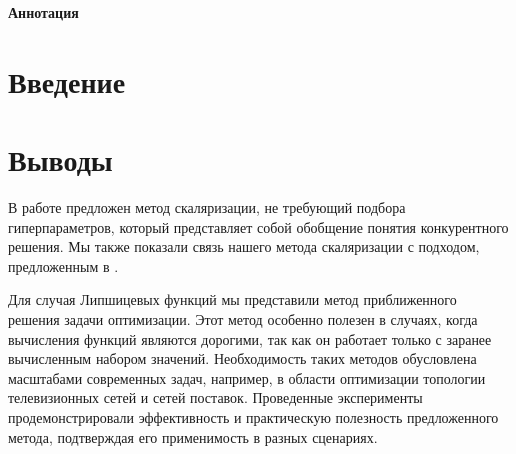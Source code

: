 \documentclass[14pt]{extarticle}
\begin{document}

\setcounter{page}{2}

\tableofcontents
\newpage
\begin{center}
    \Large{\textbf{Аннотация}}
\end{center}
\abstractText
\newpage


% 
\section{Введение} 

\newpage

\newpage

\newpage


\newpage
\section{Выводы}
В работе предложен метод скаляризации, не требующий подбора гиперпараметров, который представляет собой обобщение понятия конкурентного решения. Мы также показали связь нашего метода скаляризации с подходом, предложенным в \cite{gembicki1975approach}.

Для случая Липшицевых функций мы представили метод приближенного решения задачи оптимизации. Этот метод особенно полезен в случаях, когда вычисления функций являются дорогими, так как он работает только с заранее вычисленным набором значений. Необходимость таких методов обусловлена масштабами современных задач, например, в области оптимизации топологии телевизионных сетей и сетей поставок. Проведенные эксперименты продемонстрировали эффективность и практическую полезность предложенного метода, подтверждая его применимость в разных сценариях.
\newpage


\end{document}
